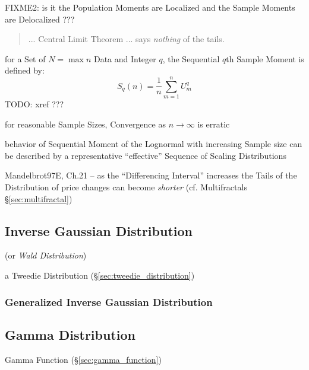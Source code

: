 FIXME2: is it the Population Moments are Localized and the Sample Moments are
Delocalized ???

\begin{quote}
  ... Central Limit Theorem ... says \emph{nothing} of the tails.
\end{quote}

for a Set of $N = \max n$ Data and Integer $q$, the Sequential $q$th Sample
Moment is defined by:
\[
  S_q(n) = \frac{1}{n} \sum_{m = 1}^n U_m^q
\]
TODO: xref ???

for reasonable Sample Sizes, Convergence as $n \to \infty$ is erratic

behavior of Sequential Moment of the Lognormal with increasing Sample size can
be described by a representative ``effective'' Sequence of Scaling Distributions

Mandelbrot97E, Ch.21 -- as the ``Differencing Interval'' increases the Tails of
the Distribution of price changes can become \emph{shorter} (cf. Multifractals
\S\ref{sec:multifractal})



\subsection{Inverse Gaussian Distribution}\label{sec:inverse_gaussian}

(or \emph{Wald Distribution})

a Tweedie Distribution (\S\ref{sec:tweedie_distribution})



\subsubsection{Generalized Inverse Gaussian Distribution}
\label{sec:generalized_inverse_gaussian}



\subsection{Gamma Distribution}\label{sec:gamma_distribution}

Gamma Function (\S\ref{sec:gamma_function})

